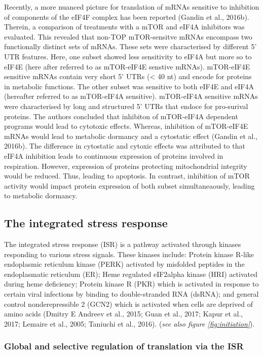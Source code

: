 \documentclass[12pt,openany]{book}
\begin{document}
Recently, a more nuanced picture for translation of mRNAs sensitive to
inhibition of components of the eIF4F complex has been reported (Gandin
et al., 2016b). Therein, a comparison of treatments with a mTOR and
eIF4A inhibitors was evaluated. This revealed that non-TOP mTOR-sensitve
mRNAs encompass two functionally distinct sets of mRNAs. These sets were
characterised by different 5' UTR features. Here, one subset showed less
sensitivity to eIF4A but more so to eIF4E (here after referred to as
mTOR-eIF4E senstive mRNAs). mTOR-eIF4E sensitive mRNAs contain very
short 5' UTRs (\textless{} 40 nt) and encode for proteins in metabolic
functions. The other subset was sensitive to both eIF4E and eIF4A
(hereafter referred to as mTOR-eIF4A sensitive). mTOR-eIF4A sensitive
mRNAs were characterised by long and structured 5' UTRs that endoce for
pro-surival proteins. The authors concluded that inhibiton of mTOR-eIF4A
dependent programs would lead to cytotoxic effects. Whereas, inhibition
of mTOR-eIF4E mRNAs would lead to metabolic dormancy and a cytostatic
effect (Gandin et al., 2016b). The difference in cytostatic and cytoxic
effects was attributed to that eIF4A inhibition leads to continuous
expression of proteins involved in respiration. However, expression of
proteins protecting mitochondrial integrity would be reduced. Thus,
leading to apoptosis. In contrast, inhibition of mTOR activity would
impact protein expression of both subset simultaneaously, leading to
metabolic dormancy.

\subsection{The integrated stress response}

The integrated stress response (ISR) is a pathway activated through
kinases responding to various stress signals. These kinases include:
Protein kinase R-like endoplasmic reticulum kinase (PERK) activated by
misfolded peptides in the endoplasmatic reticulum (ER); Heme regulated
eIF2alpha kinase (HRI) activated during heme deficiency; Protein kinase
R (PKR) which is activated in response to certain viral infections by
binding to double-stranded RNA (dsRNA); and general control
nonderepressible 2 (GCN2) which is activated when cells are deprived of
amino acids (Dmitry E Andreev et al., 2015; Guan et al., 2017; Kapur et
al., 2017; Lemaire et al., 2005; Taniuchi et al., 2016). (\emph{see also
figure \ref{fig:initiation}}).

\subsubsection{Global and selective regulation of translation via the ISR}
\end{document}

